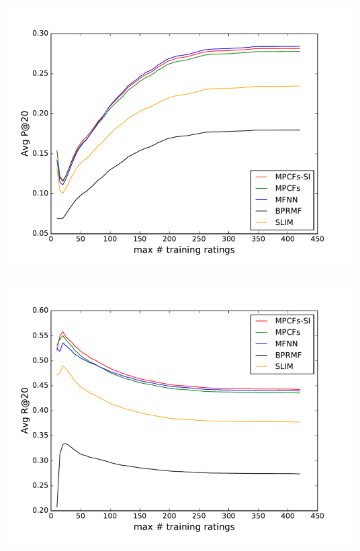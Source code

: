 \begin{figure}
	\centering
	\begin{subfigure}[b]{0.46\linewidth}
		\includegraphics[width=\linewidth]{./section-chapter2/figures/ml-100k_comparison_p20.pdf}
	\end{subfigure}
	\begin{subfigure}[b]{0.46\linewidth}
		\includegraphics[width=\linewidth]{./section-chapter2/figures/ml-100k_comparison_r20.pdf}
	\end{subfigure}
	\begin{subfigure}[b]{0.46\linewidth}

\end{subfigure}
\end{figure}
